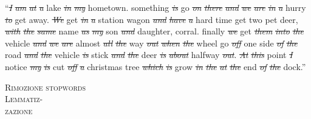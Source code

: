 \begin{minipage}[t]{\textwidth}
\begin{minipage}[t]{0.75\textwidth}
    \begin{spacing}{0.5}
    {\scriptsize
    ``\sout{\it I} \sout{\it am} \sout{\it at} \sout{\it a} {\color{orangeUnicam}lake} \sout{\it in} \sout{\it my} {\color{orangeUnicam} hometown}.
    {\color{orangeUnicam}something} \sout{\it is} {\color{orangeUnicam}go} \sout{\it on} \sout{\it there} \sout{\it and} \sout{\it we} \sout{\it are} \sout{\it in}
    \sout{\it a} {\color{orangeUnicam}hurry} \sout{\it to} {\color{orangeUnicam}get} {\color{orangeUnicam}away}.
    \sout{\it We} {\color{orangeUnicam}get} \sout{\it in} \sout{\it a} {\color{orangeUnicam}station} {\color{orangeUnicam}wagon} \sout{\it and} \sout{\it have} \sout{\it a}
    {\color{orangeUnicam}hard} {\color{orangeUnicam}time} {\color{orangeUnicam}get} {\color{orangeUnicam}two} {\color{orangeUnicam}pet} {\color{orangeUnicam}deer}, \sout{\it with} \sout{\it the}
    \sout{\it same} {\color{orangeUnicam}name} \sout{\it as} \sout{\it my} {\color{orangeUnicam}son} \sout{\it and} {\color{orangeUnicam}daughter}, {\color{orangeUnicam}corral}.
    {\color{orangeUnicam}finally} \sout{\it we} {\color{orangeUnicam}get} \sout{\it them} \sout{\it into} \sout{\it the} {\color{orangeUnicam}vehicle} \sout{\it and} \sout{\it we}
    \sout{\it are} {\color{orangeUnicam}almost} \sout{\it all} \sout{\it the} {\color{orangeUnicam}way} \sout{\it out} \sout{\it when} \sout{\it the} {\color{orangeUnicam}wheel}
    {\color{orangeUnicam}go} \sout{\it off} {\color{orangeUnicam}one} {\color{orangeUnicam}side} \sout{\it of} \sout{\it the} {\color{orangeUnicam}road}
    \sout{\it and} \sout{\it the} {\color{orangeUnicam}vehicle} \sout{\it is} {\color{orangeUnicam}stick} \sout{\it and} \sout{\it the} {\color{orangeUnicam}deer} \sout{\it is}
    \sout{\it about} {\color{orangeUnicam}halfway} \sout{\it out}.
    \sout{\it At} \sout{\it this} {\color{orangeUnicam}point} \sout{\it I} {\color{orangeUnicam}notice} \sout{\it my}  \sout{\it is}
    {\color{orangeUnicam}cut} \sout{\it off} \sout{\it a} {\color{orangeUnicam}christmas} {\color{orangeUnicam}tree} \sout{\it which} \sout{\it is} {\color{orangeUnicam}grow}
    \sout{\it in} \sout{\it the}  \sout{\it at} \sout{\it the} {\color{orangeUnicam}end} \sout{\it of} \sout{\it the} {\color{orangeUnicam}dock}.''}
    \end{spacing}
\end{minipage}
\hfill
    \begin{minipage}[t]{0.23\textwidth}
        \centering
        {\color{orangeUnicam} \scshape \small Rimozione stopwords} \\
        \medskip
        {\color{orangeUnicam} \scshape \small Lemmatiz-\\ zazione}
    \end{minipage}
\end{minipage}
